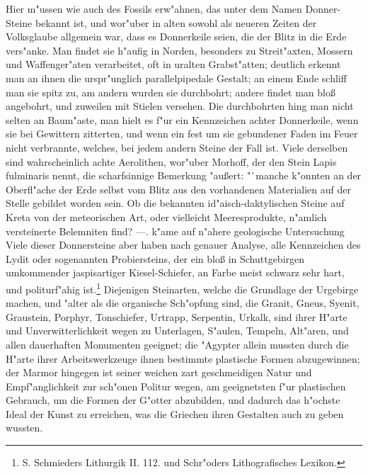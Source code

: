 \documentclass[a4paper, 11pt, oneside, polutonikogreek, german]{article}
\begin{document}
Hier m"ussen wie auch des Fossils erw"ahnen, das unter dem Namen Donner-Steine bekannt ist, und wor"uber in alten sowohl als neueren Zeiten der Volksglaube allgemein war, dass es Donnerkeile seien, die der Blitz in die Erde vers"anke. Man findet sie h"aufig in Norden, besonders zu Streit"axten, Mossern und Waffenger"aten verarbeitet, oft in uralten Grabst"atten; deutlich erkennt man an ihnen die urspr"unglich parallelpipedale Gestalt; an einem Ende schliff man sie spitz zu, am andern wurden sie durchbohrt; andere findet man bloß angebohrt, und zuweilen mit Stielen versehen. Die durchbohrten hing man nicht selten an Baum"aste, man hielt es f"ur ein Kennzeichen achter Donnerkeile, wenn sie bei Gewittern zitterten, und wenn ein fest um sie gebundener Faden im Feuer nicht verbrannte, welches, bei jedem andern Steine der Fall ist. Viele derselben sind wahrscheinlich achte Aerolithen, wor"uber Morhoff, der den Stein Lapis fulminaris nennt, die scharfsinnige Bemerkung "außert: "`manche k"onnten an der Oberfl"ache der Erde selbst vom Blitz aus den vorhandenen Materialien auf der Stelle gebildet worden sein. Ob die bekannten id"aisch-daktylischen Steine auf Kreta von der meteorischen Art, oder vielleicht Meeresprodukte, n"amlich versteinerte Belemniten find? ---. k"ame auf n"ahere geologische Untersuchung Viele dieser Donnersteine aber haben nach genauer Analyse, alle Kennzeichen des Lydit oder sogenannten Probiersteins, der ein bloß in Schuttgebirgen umkommender jaspisartiger Kiesel-Schiefer, an Farbe meist schwarz sehr hart, und politurf"ahig ist.\footnote{S. Schmieders Lithurgik II. 112. und Schr"oders Lithografisches Lexikon.} Diejenigen Steinarten, welche die Grundlage der Urgebirge machen, und "alter als die organische Sch"opfung sind, die Granit, Gneus, Syenit, Graustein, Porphyr, Tonschiefer, Urtrapp, Serpentin, Urkalk, sind ihrer H"arte und Unverwitterlichkeit wegen zu Unterlagen, S"aulen, Tempeln, Alt"aren, und allen dauerhaften Monumenten geeignet; die "Agypter allein mussten durch die H"arte ihrer Arbeitswerkzeuge ihnen bestimmte plastische Formen abzugewinnen; der Marmor hingegen ist seiner weichen zart geschmeidigen Natur und Empf"anglichkeit zur sch"onen Politur wegen, am geeignetsten f"ur plastischen Gebrauch, um die Formen der G"otter abzubilden, und dadurch das h"ochste Ideal der Kunst zu erreichen, was die Griechen ihren Gestalten auch zu geben wussten.
\end{document}
